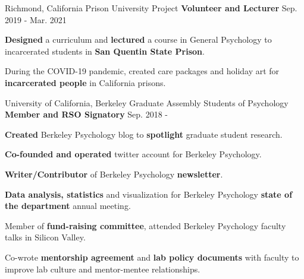 

\begin{cventries}
    
  \cventry
    {Richmond, California} %
    {Prison University Project}
    {\textbf{Volunteer and Lecturer}} %
    {Sep. 2019 - Mar. 2021} %
    {
      \begin{cvitems} %
        \item {\textbf{Designed} a curriculum and \textbf{lectured} a course in General Psychology to incarcerated students in \textbf{San Quentin State Prison}.}
        \item {During the COVID-19 pandemic, created care packages and holiday art for \textbf{incarcerated people} in California prisons.}
      \end{cvitems}
    }
    
  \cventry 
    {University of California, Berkeley} %
    {Graduate Assembly Students of Psychology}
    {\textbf{Member and RSO Signatory}} %
    {Sep. 2018 - } %
    {
      \begin{cvitems} %
        \item {\textbf{Created} Berkeley Psychology blog to \textbf{spotlight} graduate student research.}
        \item {\textbf{Co-founded and operated} twitter account for Berkeley Psychology.}
        \item {\textbf{Writer/Contributor} of Berkeley Psychology \textbf{newsletter}.}
        \item {\textbf{Data analysis, statistics} and visualization for Berkeley Psychology \textbf{state of the department} annual meeting.}
        \item {Member of \textbf{fund-raising committee}, attended Berkeley Psychology faculty talks in Silicon Valley.}
        \item {Co-wrote \textbf{mentorship agreement} and \textbf{lab policy documents} with faculty to improve lab culture and mentor-mentee relationships.}
      \end{cvitems}
    }
    

\end{cventries}
